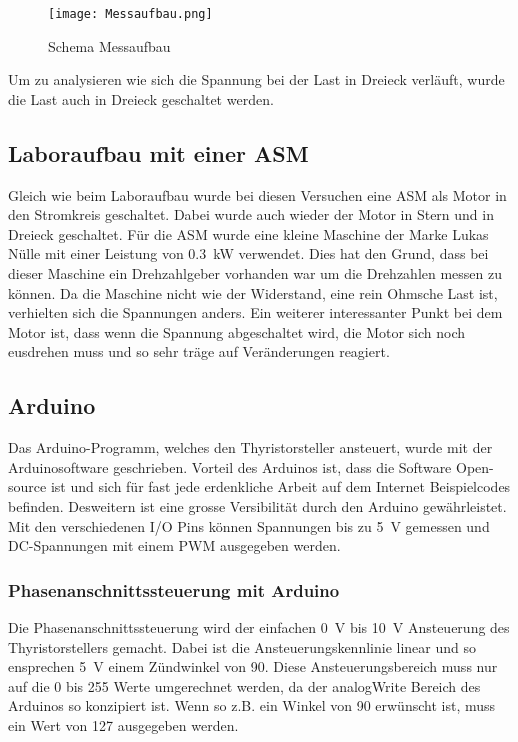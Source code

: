 \begin{figure}[ht!]
	\centering
	\texttt{[image: Messaufbau.png]}	
	\caption{Schema Messaufbau}\label{fig:Messaufbau}
\end{figure}

Um zu analysieren wie sich die Spannung bei der Last in Dreieck verläuft, wurde die Last auch in Dreieck geschaltet werden.

\subsection{Laboraufbau mit einer ASM}
Gleich wie beim Laboraufbau wurde bei diesen Versuchen eine ASM als Motor in den Stromkreis geschaltet. Dabei wurde auch wieder der Motor in Stern und in Dreieck geschaltet. Für die ASM wurde eine kleine Maschine der Marke Lukas Nülle mit einer Leistung von \SI{0.3}{kW} verwendet. Dies hat den Grund, dass bei dieser Maschine ein Drehzahlgeber vorhanden war um die Drehzahlen messen zu können. Da die Maschine nicht wie der Widerstand, eine rein Ohmsche Last ist, verhielten sich die Spannungen anders. Ein weiterer interessanter Punkt bei dem Motor ist, dass wenn die Spannung abgeschaltet wird, die Motor sich noch eusdrehen muss und so sehr träge auf Veränderungen reagiert.

\subsection{Arduino}
Das Arduino-Programm, welches den Thyristorsteller ansteuert, wurde mit der Arduinosoftware geschrieben. Vorteil des Arduinos ist, dass die Software Open-source ist und sich für fast jede erdenkliche Arbeit auf dem Internet Beispielcodes befinden. Desweitern ist eine grosse Versibilität durch den Arduino gewährleistet. Mit den verschiedenen I/O Pins können Spannungen bis zu \SI{5}{V} gemessen und DC-Spannungen mit einem PWM ausgegeben werden.

\subsubsection{Phasenanschnittssteuerung mit Arduino}
Die Phasenanschnittssteuerung wird der einfachen \SI{0}{V} bis \SI{10}{V} Ansteuerung des Thyristorstellers gemacht. Dabei ist die Ansteuerungskennlinie linear und so ensprechen \SI{5}{V} einem Zündwinkel von 90\textdegree. Diese Ansteuerungsbereich muss nur auf die 0 bis 255 Werte umgerechnet werden, da der analogWrite Bereich des Arduinos so konzipiert ist. Wenn so z.B. ein Winkel von 90\textdegree \hspace{0.02cm} erwünscht ist, muss ein Wert von 127 ausgegeben werden.

